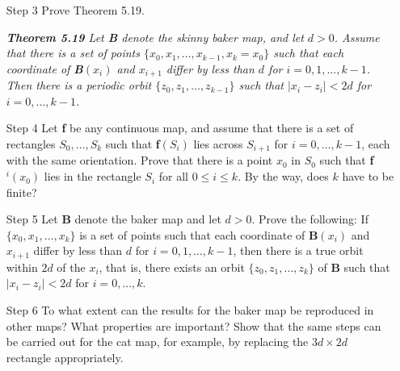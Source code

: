 \documentclass[12pt,letterpaper,reqno]{amsart}
\begin{document}
\begin{enumerate}
\begin{enumerate}
\begin{flushleft}
    \end{flushleft}
    
    \item[Step 3] Prove Theorem 5.19.\newline
    
    \textit{\textbf{Theorem 5.19} Let \textbf{B} denote the skinny baker map, and let $d > 0$. Assume that there is a set of points $\{x_0, x_1, \ldots, x_{k-1}, x_k = x_0\}$ such that each coordinate of \textbf{B}$(x_i)$ and $x_{i+1}$ differ by less than $d$ for $i = 0,1, \ldots, k-1$. Then there is a periodic orbit $\{z_0, z_1, \ldots, z_{k-1}\}$ such that $|x_i - z_i| < 2d$ for $i = 0, \ldots, k-1$.}
    \begin{flushleft}
    
    \end{flushleft}
    
    \item[Step 4] Let \textbf{f} be any continuous map, and assume that there is a set of rectangles $S_0, \ldots, S_k$ such that \textbf{f}$(S_i)$ lies across $S_{i+1}$ for $i = 0, \ldots, k-1$, each with the same orientation. Prove that there is a point $x_0$ in $S_0$ such that \textbf{f}$^i(x_0)$ lies in the rectangle $S_i$ for all $0 \leq i \leq k$. By the way, does $k$ have to be finite?
    \begin{flushleft}
    
    \end{flushleft}
    
    \item[Step 5] Let \textbf{B} denote the baker map and let $d > 0$. Prove the following: If $\{x_0, x_1, \ldots, x_k \}$ is a set of points such that each coordinate of \textbf{B}$(x_i)$ and $x_{i+1}$ differ by less than $d$ for $i = 0, 1, \ldots, k-1$, then there is a true orbit within $2d$ of the $x_i$, that is, there exists an orbit $\{z_0, z_1, \ldots, z_k\}$ of \textbf{B} such that $|x_i - z_i| < 2d$ for $i = 0, \ldots, k$.
    \begin{flushleft}
    
    \end{flushleft}
    
    \item[Step 6] To what extent can the results for the baker map be reproduced in other maps? What properties are important? Show that the same steps can be carried out for the cat map, for example, by replacing the $3d \times 2d$ rectangle appropriately.
    \begin{flushleft}
    

\end{flushleft}
\end{enumerate}
\end{enumerate}
\end{document}
